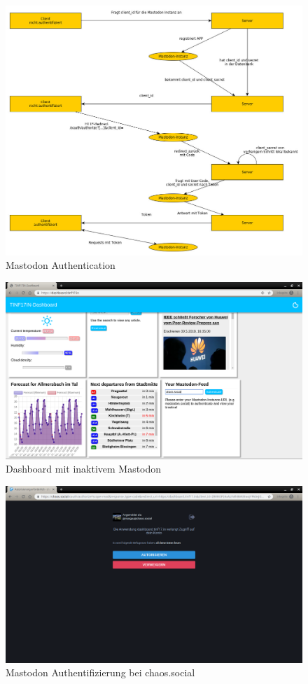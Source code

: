 \documentclass[fleqn,10pt]{SelfArx} %
\begin{document}
\begin{figure}
\includegraphics[width=\linewidth]{mastodon.jpg}
\caption{Mastodon Authentication}
\label{fig:mastodon1}
\end{figure}
\begin{figure}
	\includegraphics[width=\linewidth]{images/1.png}
	\caption{Dashboard mit inaktivem Mastodon}
	\label{fig:demo1}
\end{figure}
\begin{figure}
\includegraphics[width=\linewidth]{images/2.png}
\caption{Mastodon Authentifizierung bei chaos.social}
\label{fig:demo2}
\end{figure}
\end{document}
